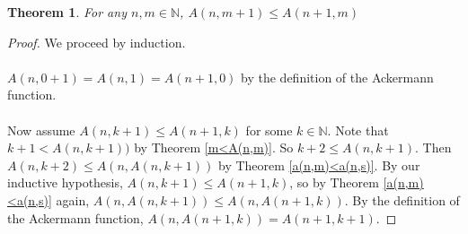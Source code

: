 \documentclass[12pt, letterpaper]{article}
\newtheorem{theorem}{Theorem}
\theoremstyle{case}
\begin{document}
    \begin{theorem}
      \label{a(n,m+1)<=a(n+1,m)}
      For any $n, m \in \mathbb{N}$, $A(n, m + 1) \leq A(n + 1, m)$
    \end{theorem}
    \begin{proof}
      We proceed by induction.
      \\
      \\
      $A(n, 0 + 1) = A(n, 1) = A(n + 1, 0)$ by the definition of the Ackermann function.
      \\
      \\
      Now assume $A(n, k + 1) \leq A(n + 1, k)$ for some $k \in \mathbb{N}$.
      Note that $k + 1 < A(n, k + 1))$ by Theorem \ref{m<A(n,m)}.
      So $k + 2 \leq A(n, k + 1)$.
      Then $A(n, k + 2) \leq A(n, A(n, k + 1))$ by Theorem \ref{a(n,m)<a(n,s)}.
      By our inductive hypothesis, $A(n, k + 1) \leq A(n + 1, k)$, so by Theorem \ref{a(n,m)<a(n,s)} again,
      $A(n, A(n, k + 1)) \leq A(n, A(n + 1, k))$.
      By the definition of the Ackermann function, $A(n, A(n + 1, k)) = A(n + 1, k + 1)$.
    \end{proof}
\end{document}
